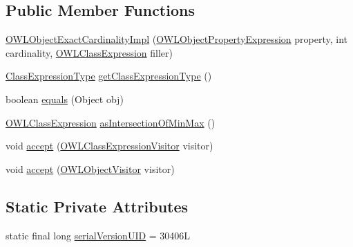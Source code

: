 \subsection*{Public Member Functions}
\begin{DoxyCompactItemize}
\item 
\hyperlink{classuk_1_1ac_1_1manchester_1_1cs_1_1owl_1_1owlapi_1_1_o_w_l_object_exact_cardinality_impl_a03a2b67bc0349e7ea56dab52f9085b76}{O\-W\-L\-Object\-Exact\-Cardinality\-Impl} (\hyperlink{interfaceorg_1_1semanticweb_1_1owlapi_1_1model_1_1_o_w_l_object_property_expression}{O\-W\-L\-Object\-Property\-Expression} property, int cardinality, \hyperlink{interfaceorg_1_1semanticweb_1_1owlapi_1_1model_1_1_o_w_l_class_expression}{O\-W\-L\-Class\-Expression} filler)
\item 
\hyperlink{enumorg_1_1semanticweb_1_1owlapi_1_1model_1_1_class_expression_type}{Class\-Expression\-Type} \hyperlink{classuk_1_1ac_1_1manchester_1_1cs_1_1owl_1_1owlapi_1_1_o_w_l_object_exact_cardinality_impl_af5980a5e08608b284a695e420d25b51d}{get\-Class\-Expression\-Type} ()
\item 
boolean \hyperlink{classuk_1_1ac_1_1manchester_1_1cs_1_1owl_1_1owlapi_1_1_o_w_l_object_exact_cardinality_impl_aab17372ee581133792022510109f8b47}{equals} (Object obj)
\item 
\hyperlink{interfaceorg_1_1semanticweb_1_1owlapi_1_1model_1_1_o_w_l_class_expression}{O\-W\-L\-Class\-Expression} \hyperlink{classuk_1_1ac_1_1manchester_1_1cs_1_1owl_1_1owlapi_1_1_o_w_l_object_exact_cardinality_impl_a566f5dc0d4566e03937e1051d454d0c8}{as\-Intersection\-Of\-Min\-Max} ()
\item 
void \hyperlink{classuk_1_1ac_1_1manchester_1_1cs_1_1owl_1_1owlapi_1_1_o_w_l_object_exact_cardinality_impl_a136c39da20fc475435db9d3417acc303}{accept} (\hyperlink{interfaceorg_1_1semanticweb_1_1owlapi_1_1model_1_1_o_w_l_class_expression_visitor}{O\-W\-L\-Class\-Expression\-Visitor} visitor)
\item 
void \hyperlink{classuk_1_1ac_1_1manchester_1_1cs_1_1owl_1_1owlapi_1_1_o_w_l_object_exact_cardinality_impl_a381dc0e9c2396f56065f0e412cae7368}{accept} (\hyperlink{interfaceorg_1_1semanticweb_1_1owlapi_1_1model_1_1_o_w_l_object_visitor}{O\-W\-L\-Object\-Visitor} visitor)
\end{DoxyCompactItemize}
\subsection*{Static Private Attributes}
\begin{DoxyCompactItemize}
\item 
static final long \hyperlink{classuk_1_1ac_1_1manchester_1_1cs_1_1owl_1_1owlapi_1_1_o_w_l_object_exact_cardinality_impl_a70afbaab703212bb9b568c293a4476c7}{serial\-Version\-U\-I\-D} = 30406\-L
\end{DoxyCompactItemize}
